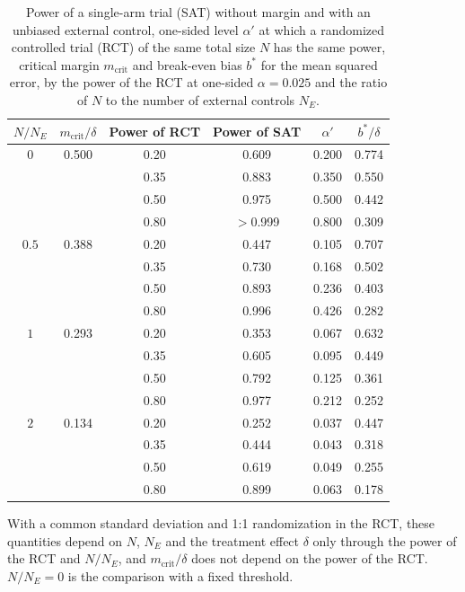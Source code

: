 \begin{table}[!htb]
\centering
\caption{Power of a single-arm trial (SAT) without margin and with an unbiased external control, one-sided level $\alpha'$ at which a randomized controlled trial (RCT) of the same total size $N$ has the same power, critical margin $m_{\mathrm{crit}}$ and break-even bias $b^{*}$ for the mean squared error, by the power of the RCT at one-sided $\alpha = 0.025$ and the ratio of $N$ to the number of external controls $N_E$.}
\label{tab:relative}
\begin{tabular}{cccccc}
\toprule
$N/N_E$ & $m_{\mathrm{crit}}/\delta$ & Power of RCT & Power of SAT & $\alpha'$ & $b^{*}/\delta$ \\
\midrule
$0$ & 0.500 & 0.20 & 0.609 & 0.200 & 0.774 \\
 &  & 0.35 & 0.883 & 0.350 & 0.550 \\
 &  & 0.50 & 0.975 & 0.500 & 0.442 \\
 &  & 0.80 & $>$0.999 & 0.800 & 0.309 \\
\addlinespace
$0.5$ & 0.388 & 0.20 & 0.447 & 0.105 & 0.707 \\
 &  & 0.35 & 0.730 & 0.168 & 0.502 \\
 &  & 0.50 & 0.893 & 0.236 & 0.403 \\
 &  & 0.80 & 0.996 & 0.426 & 0.282 \\
\addlinespace
$1$ & 0.293 & 0.20 & 0.353 & 0.067 & 0.632 \\
 &  & 0.35 & 0.605 & 0.095 & 0.449 \\
 &  & 0.50 & 0.792 & 0.125 & 0.361 \\
 &  & 0.80 & 0.977 & 0.212 & 0.252 \\
\addlinespace
$2$ & 0.134 & 0.20 & 0.252 & 0.037 & 0.447 \\
 &  & 0.35 & 0.444 & 0.043 & 0.318 \\
 &  & 0.50 & 0.619 & 0.049 & 0.255 \\
 &  & 0.80 & 0.899 & 0.063 & 0.178 \\
\bottomrule
\end{tabular}
\par\smallskip
\begin{minipage}{0.95\linewidth}
\footnotesize
With a common standard deviation and 1:1 randomization in the RCT, these quantities depend on $N$, $N_E$ and the treatment effect $\delta$ only through the power of the RCT and $N/N_E$, and $m_{\mathrm{crit}}/\delta$ does not depend on the power of the RCT. $N/N_E = 0$ is the comparison with a fixed threshold.
\end{minipage}
\end{table}
